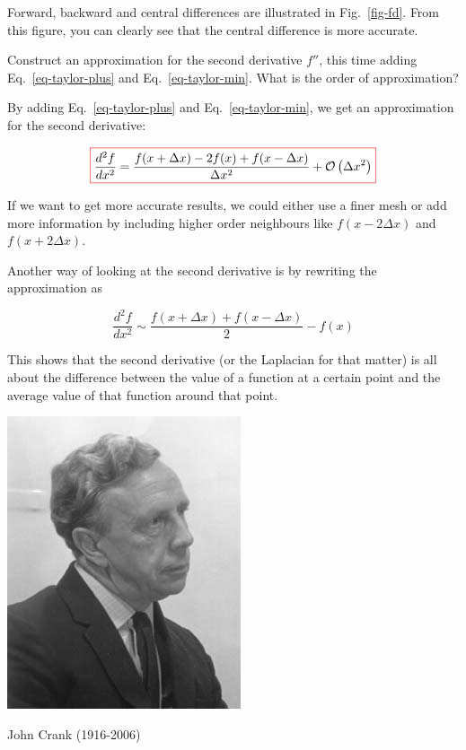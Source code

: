 Forward, backward and central differences are illustrated in Fig.~\ref{fig-fd}. From this figure, you can clearly see that the central difference is more accurate.


\begin{cue}
Construct an approximation for the second derivative $f''$, this time adding Eq.~\ref{eq-taylor-plus} and Eq.~\ref{eq-taylor-min}. What is the order of approximation? 
\end{cue}

By adding Eq.~\ref{eq-taylor-plus} and Eq.~\ref{eq-taylor-min}, we get an approximation for the second derivative:

\begin{equation}
\fbox{$\displaystyle
\frac{d^2 f}{d x^2} = \frac{f(x + \Delta x) -2 f(x) + f(x - \Delta x)}{ \Delta x^2} + \mathcal{O}\left(\Delta x^2\right)
$}
\end{equation} 

If we want to get more accurate results, we could either use a finer mesh or add more information by including higher order neighbours like $f(x-2\Delta x)$ and $f(x+2\Delta x)$.

Another way of looking at the second derivative is by rewriting the approximation as

\begin{equation}
\frac{d^2 f}{d x^2} \sim  \frac{f(x + \Delta x) + f(x - \Delta x)}{2} - f(x)
\end{equation}

\noindent{}This shows that the second derivative (or the Laplacian for that matter) is all about the difference between the value of a function at a certain point and the average value of that function around that point.

\begin{marginfigure}[1.0cm]
  \includegraphics{numeric/figures/j_crank}
  \caption{John Crank (1916-2006)}
\end{marginfigure}

